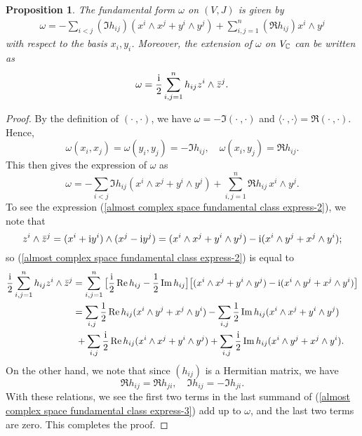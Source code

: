 \documentclass[11pt]{book}
\newtheorem{proposition}[theorem]{Proposition}
\theoremstyle{definition}
\begin{document}
\begin{proposition}\label{almost complex space fundamental class express}
The fundamental form $\omega$ on $(V,J)$ is given by
\begin{align}\label{almost complex space fundamental class express-1}
\omega=-\sum_{i<j}(\Im h_{ij})(x^i\wedge x^j+y^i\wedge y^j)+\sum_{i,j=1}^{n}(\Re h_{ij})x^i\wedge y^j
\end{align}
with respect to the basis $x_i,y_i$. Moreover, the extension of $\omega$ on $V_{\mathbb{C}}$ can be written as
\begin{align}\label{almost complex space fundamental class express-2}
\omega=\frac{\mathrm{i}}{2}\sum_{i,j=1}^{n}h_{ij}z^i\wedge\bar{z}^j.
\end{align}
\end{proposition}
\begin{proof}
By the definition of $(\cdot\ ,\cdot)$, we have $\omega=-\Im(\cdot\ ,\cdot)$ and $\langle\cdot\ ,\cdot\rangle=\Re(\cdot\ ,\cdot)$. Hence,
\[\omega(x_i,x_j)=\omega(y_i,y_j)=-\Im h_{ij},\quad \omega(x_i,y_j)=\Re h_{ij}.\]
This then gives the expression of $\omega$ as
\[\omega=-\sum_{i<j}\Im h_{ij}(x^i\wedge x^j+y^i\wedge y^j)+\sum_{i,j=1}^{n}\Re h_{ij}\,x^i\wedge y^j.\]
To see the expression (\ref{almost complex space fundamental class express-2}), we note that
\[z^i\wedge\bar{z}^j=(x^i+\mathrm{i} y^i)\wedge(x^j-\mathrm{i} y^j)=(x^i\wedge x^j+y^i\wedge y^j)-\mathrm{i}(x^i\wedge y^j+x^j\wedge y^i);\]
so (\ref{almost complex space fundamental class express-2}) is equal to
\begin{equation}\label{almost complex space fundamental class express-3}
\begin{aligned}
\frac{\mathrm{i}}{2}\sum_{i,j=1}^{n}h_{ij}z^i\wedge\bar{z}^j&=\sum_{i,j=1}^{n}\big[\frac{\mathrm{i}}{2}\operatorname{Re} h_{ij}-\frac{1}{2}\operatorname{Im} h_{ij}\big]\big[(x^i\wedge x^j+y^i\wedge y^j)-\mathrm{i}(x^i\wedge y^j+x^j\wedge y^i)\big]\\
&=\sum_{i,j}\frac{1}{2}\operatorname{Re} h_{ij}(x^i\wedge y^j+x^j\wedge y^i)-\sum_{i,j}\frac{1}{2}\operatorname{Im} h_{ij}(x^i\wedge x^j+y^i\wedge y^j)\\
&\ +\sum_{i,j}\frac{\mathrm{i}}{2}\operatorname{Re} h_{ij}(x^i\wedge x^j+y^i\wedge y^j)+\sum_{i,j}\frac{\mathrm{i}}{2}\operatorname{Im} h_{ij}(x^i\wedge y^j+x^j\wedge y^i).
\end{aligned}
\end{equation}
On the other hand, we note that since $(h_{ij})$ is a Hermitian matrix, we have
\[\Re h_{ij}=\Re h_{ji},\quad \Im h_{ij}=-\Im h_{ji}.\]
With these relations, we see the first two terms in the last summand of (\ref{almost complex space fundamental class express-3}) add up to $\omega$, and the last two terms are zero. This completes the proof.
\end{proof}
\end{document}
